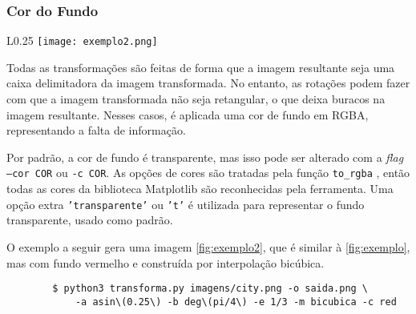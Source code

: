 \subsubsection{Cor do Fundo} \label{sec:fundo}

    \begin{wrapfigure}{L}{0.25\textwidth}
        \centering
        \texttt{[image: exemplo2.png]}
        \caption{Exemplo de execução.}
        \label{fig:exemplo2}
    \end{wrapfigure}

    Todas as transformações são feitas de forma que a imagem resultante seja uma caixa delimitadora da imagem transformada. No entanto, as rotações podem fazer com que a imagem transformada não seja retangular, o que deixa buracos na imagem resultante. Nesses casos, é aplicada uma cor de fundo em RGBA, representando a falta de informação.

    Por padrão, a cor de fundo é transparente, mas isso pode ser alterado com a \textit{flag} \texttt{--cor COR} ou \texttt{-c COR}. As opções de cores são tratadas pela função \texttt{to_rgba} \autocite{torbga}, então todas as cores da biblioteca Matplotlib são reconhecidas pela ferramenta. Uma opção extra \texttt{'transparente'} ou \texttt{'t'} é utilizada para representar o fundo transparente, usado como padrão.

    O exemplo a seguir gera uma imagem \cref{fig:exemplo2}, que é similar à \ref{fig:exemplo}, mas com fundo vermelho e construída por interpolação bicúbica.

    \begin{verbatim}
        $ python3 transforma.py imagens/city.png -o saida.png \
            -a asin\(0.25\) -b deg\(pi/4\) -e 1/3 -m bicubica -c red
    \end{verbatim}
